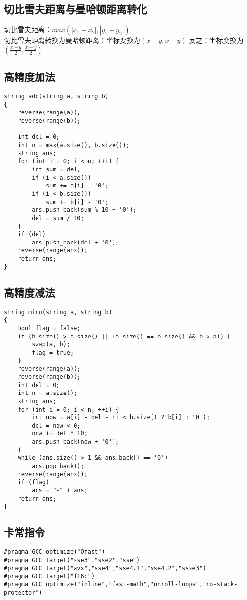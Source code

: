 \documentclass[twocolumn,a4]{article}
\begin{document}
\subsection{切比雪夫距离与曼哈顿距离转化}
切比雪夫距离：$max(\left\lvert x_1-x_2 \right\rvert, \left\lvert y_1-y_2 \right\rvert)$
\\
切比雪夫距离转换为曼哈顿距离：坐标变换为$(x+y,x-y)$
反之：坐标变换为$(\frac{x+y}{2},\frac{x-y}{2})$

\subsection{高精度加法}
\begin{lstlisting}
string add(string a, string b)
{
    reverse(range(a));
    reverse(range(b));

    int del = 0;
    int n = max(a.size(), b.size());
    string ans;
    for (int i = 0; i < n; ++i) {
        int sum = del;
        if (i < a.size())
            sum += a[i] - '0';
        if (i < b.size())
            sum += b[i] - '0';
        ans.push_back(sum % 10 + '0');
        del = sum / 10;
    }
    if (del)
        ans.push_back(del + '0');
    reverse(range(ans));
    return ans;
}
\end{lstlisting}

\subsection{高精度减法}
\begin{lstlisting}
string minu(string a, string b)
{
    bool flag = false;
    if (b.size() > a.size() || (a.size() == b.size() && b > a)) {
        swap(a, b);
        flag = true;
    }
    reverse(range(a));
    reverse(range(b));
    int del = 0;
    int n = a.size();
    string ans;
    for (int i = 0; i < n; ++i) {
        int now = a[i] - del - (i < b.size() ? b[i] : '0');
        del = now < 0;
        now += del * 10;
        ans.push_back(now + '0');
    }
    while (ans.size() > 1 && ans.back() == '0')
        ans.pop_back();
    reverse(range(ans));
    if (flag)
        ans = "-" + ans;
    return ans;
}
\end{lstlisting}


\subsection{卡常指令}
\begin{lstlisting}
#pragma GCC optimize("Ofast")
#pragma GCC target("sse3","sse2","sse")
#pragma GCC target("avx","sse4","sse4.1","sse4.2","ssse3")
#pragma GCC target("f16c")
#pragma GCC optimize("inline","fast-math","unroll-loops","no-stack-protector")
\end{lstlisting}
\end{document}
